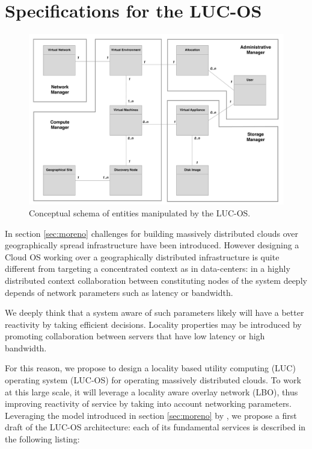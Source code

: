 \section{Specifications for the LUC-OS}
\label{sec:lucos}

\begin{figure}
	\centering
	\includegraphics[width=0.91\linewidth]{Figures/mcd_3.pdf}
	\caption{Conceptual schema of entities manipulated by the LUC-OS.}%
	\label{fig:mcd}%
\end{figure}

In section \ref{sec:moreno} challenges for building massively distributed clouds
over geographically spread infrastructure have been introduced. However 
designing a Cloud OS working over a geographically distributed infrastructure is
quite different from targeting a concentrated context as in data-centers: in
a highly distributed context collaboration between constituting nodes of the 
system deeply depends of network parameters such as latency or bandwidth. 

We deeply think that a system aware of such parameters likely will have a better
reactivity by taking efficient decisions. Locality properties may be introduced
by promoting collaboration between servers that have low latency or high 
bandwidth.

For this reason, we propose to design a locality based utility computing (LUC)
operating system (LUC-OS) for operating massively distributed clouds. To work at
this large scale, it will leverage a locality aware overlay network (LBO), thus 
improving reactivity of service by taking into account networking parameters. 
Leveraging the model introduced in section \ref{sec:moreno} by 
\cite{moreno2012iaas}, we propose a first draft of the LUC-OS architecture: each
of its fundamental services is described in the following listing:

